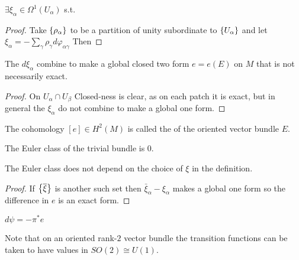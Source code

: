 \documentclass{article}
\begin{document}
\begin{lemma}
	$\exists \xi_\alpha \in \Omega^1(U_\alpha)$ s.t. 
\end{lemma}
\begin{proof}
	Take $\left\{ \rho_\alpha \right\}$ to be a partition of unity subordinate to $\left\{ U_\alpha \right\}$ and let $
\xi_\alpha = -\sum_\gamma \rho_\gamma d\varphi_{\alpha\gamma}	$
Then 
\end{proof}

\begin{lemma}
	The $d\xi_\alpha$ combine to make a global closed two form $e=e(E)$ on $M$ that is not necessarily exact. 
\end{lemma}
\begin{proof}
	On $U_\alpha \cap U_\beta$ 
Closed-ness is clear, as on each patch it is exact, but in general the $\xi_\alpha$ do not combine to make a global one form. 
\end{proof}

\begin{definition}
	The cohomology $[e] \in H^2(M)$ is called the  of the oriented vector bundle $E$. 
\end{definition}

\begin{example}
	The Euler class of the trivial bundle is 0.
\end{example}

\begin{prop}
	The Euler class does not depend on the choice of $\xi$ in the definition. 
\end{prop}
\begin{proof}
	If $\left\{ \overline{\xi} \right\}$ is another such set then $\bar{\xi}_\alpha - \xi_\alpha$ makes a global one form so the difference in $e$ is an exact form. 
\end{proof}

\begin{prop}
$d\psi = -\pi^\ast e$
\end{prop}

\begin{remark}
	Note that on an oriented rank-$2$ vector bundle the transition functions can be taken to have values in $SO(2) \cong U(1)$. 
\end{remark}
\end{document}
